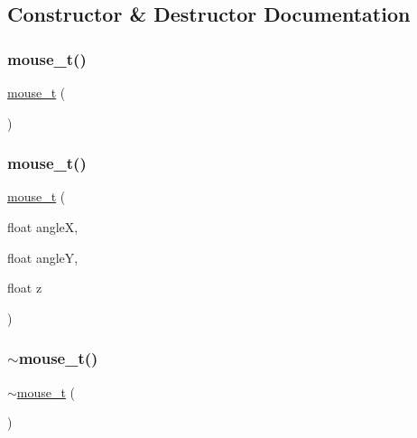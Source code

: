 \subsection{Constructor \& Destructor Documentation}
\mbox{\label{classmouse__t_a0117a5a34b22dea1ff9b9eb2872ed107}} 
\subsubsection{\texorpdfstring{mouse\+\_\+t()}{mouse\_t()}\hspace{0.1cm}{\footnotesize\ttfamily [1/2]}}
{\footnotesize\ttfamily \hyperlink{classmouse__t}{mouse\+\_\+t} (\begin{DoxyParamCaption}{ }\end{DoxyParamCaption})\hspace{0.3cm}{\ttfamily [inline]}}

\mbox{\label{classmouse__t_a691b04ef52f94573b23d11dda776c151}} 
\subsubsection{\texorpdfstring{mouse\+\_\+t()}{mouse\_t()}\hspace{0.1cm}{\footnotesize\ttfamily [2/2]}}
{\footnotesize\ttfamily \hyperlink{classmouse__t}{mouse\+\_\+t} (\begin{DoxyParamCaption}\item[{float}]{angleX,  }\item[{float}]{angleY,  }\item[{float}]{z }\end{DoxyParamCaption})}

\mbox{\label{classmouse__t_abe009b8c5b82914804113d5a85ee641a}} 
\subsubsection{\texorpdfstring{$\sim$mouse\+\_\+t()}{~mouse\_t()}}
{\footnotesize\ttfamily $\sim$\hyperlink{classmouse__t}{mouse\+\_\+t} (\begin{DoxyParamCaption}{ }\end{DoxyParamCaption})\hspace{0.3cm}{\ttfamily [inline]}}



